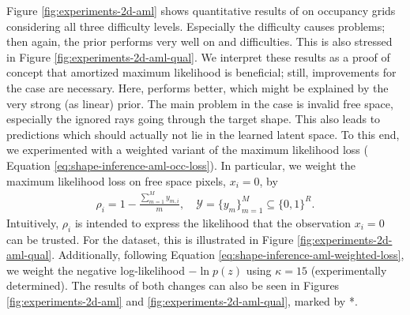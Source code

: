 Figure \ref{fig:experiments-2d-aml} shows quantitative results of \AML on occupancy
grids considering all three difficulty levels. Especially the \hard
difficulty causes problems; then again,
the \VAE prior performs very well on \easy and \moderate difficulties. This is also
stressed in Figure \ref{fig:experiments-2d-aml-qual}. We interpret these results
as a proof of concept that amortized maximum likelihood is beneficial; still,
improvements for the \hard case are necessary.
Here, \PPCA performs better, which might be explained by the very strong (as linear)
prior. The main problem in the \hard case is invalid free space,
especially the ignored rays going through the target shape. This also leads to predictions
which should actually not lie in the learned latent space. To this end, we
experimented with a weighted variant of the maximum likelihood loss (\cf
Equation \eqref{eq:shape-inference-aml-occ-loss}).
In particular, we weight the maximum likelihood loss on free space pixels,
\ie $x_i = 0$, by
\begin{align}
  \rho_i = 1 - \frac{\sum_{m = 1}^M y_{m,i}}{m},\quad \mathcal{Y} = \{y_m\}_{m = 1}^M \subseteq \{0,1\}^R.
\end{align}
Intuitively, $\rho_i$ is intended to express the likelihood that the
observation $x_i = 0$ can be trusted.
For the \Rect dataset, this is illustrated
in Figure \ref{fig:experiments-2d-aml-qual}. Additionally,
following Equation \eqref{eq:shape-inference-aml-weighted-loss}, we weight
the negative log-likelihood $- \ln p(z)$ using $\kappa = 15$ (experimentally
determined). The results of both changes can also be seen in Figures 
\ref{fig:experiments-2d-aml} and \ref{fig:experiments-2d-aml-qual},
marked by *.



